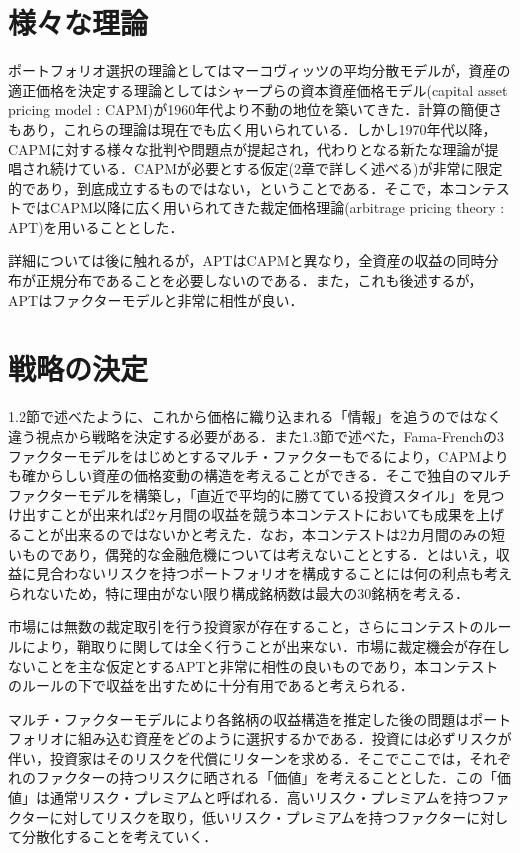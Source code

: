 \documentclass[11pt]{jreport}
\begin{document}
\section{様々な理論}
ポートフォリオ選択の理論としてはマーコヴィッツの平均分散モデルが，資産の適正価格を決定する理論としてはシャープらの資本資産価格モデル(capital asset pricing model : CAPM)が1960年代より不動の地位を築いてきた．計算の簡便さもあり，これらの理論は現在でも広く用いられている．しかし1970年代以降，CAPMに対する様々な批判や問題点が提起され，代わりとなる新たな理論が提唱され続けている．CAPMが必要とする仮定(2章で詳しく述べる)が非常に限定的であり，到底成立するものではない，ということである．そこで，本コンテストではCAPM以降に広く用いられてきた裁定価格理論(arbitrage pricing theory : APT)を用いることとした．

詳細については後に触れるが，APTはCAPMと異なり，全資産の収益の同時分布が正規分布であることを必要しないのである．また，これも後述するが，APTはファクターモデルと非常に相性が良い．

\section{戦略の決定}
1.2節で述べたように、これから価格に織り込まれる「情報」を追うのではなく違う視点から戦略を決定する必要がある．また1.3節で述べた，Fama-Frenchの3ファクターモデルをはじめとするマルチ・ファクターもでるにより，CAPMよりも確からしい資産の価格変動の構造を考えることができる．そこで独自のマルチファクターモデルを構築し，「直近で平均的に勝てている投資スタイル」を見つけ出すことが出来れば2ヶ月間の収益を競う本コンテストにおいても成果を上げることが出来るのではないかと考えた．なお，本コンテストは2カ月間のみの短いものであり，偶発的な金融危機については考えないこととする．とはいえ，収益に見合わないリスクを持つポートフォリオを構成することには何の利点も考えられないため，特に理由がない限り構成銘柄数は最大の30銘柄を考える．

市場には無数の裁定取引を行う投資家が存在すること，さらにコンテストのルールにより，鞘取りに関しては全く行うことが出来ない．市場に裁定機会が存在しないことを主な仮定とするAPTと非常に相性の良いものであり，本コンテストのルールの下で収益を出すために十分有用であると考えられる．

マルチ・ファクターモデルにより各銘柄の収益構造を推定した後の問題はポートフォリオに組み込む資産をどのように選択するかである．投資には必ずリスクが伴い，投資家はそのリスクを代償にリターンを求める．そこでここでは，それぞれのファクターの持つリスクに晒される「価値」を考えることとした．この「価値」は通常リスク・プレミアムと呼ばれる．高いリスク・プレミアムを持つファクターに対してリスクを取り，低いリスク・プレミアムを持つファクターに対して分散化することを考えていく．
\end{document}
